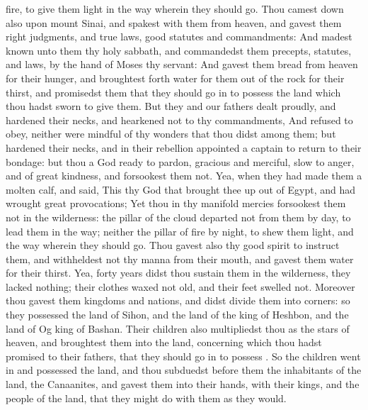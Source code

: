 {fire, to give them
light in the
way wherein they should
go.
Thou camest
down also upon
mount
Sinai, and
spakest with them from
heaven, and
gavest them
right
judgments, and
true
laws,
good
statutes and
commandments:
And madest
known unto them thy
holy
sabbath, and
commandedst them
precepts,
statutes, and
laws, by the
hand of
Moses thy
servant:
And
gavest them
bread from
heaven for their
hunger, and broughtest
forth
water for them out of the
rock for their
thirst, and
promisedst them that they should go
in to
possess the
land which thou hadst
sworn to
give them.
But they and our
fathers dealt
proudly, and
hardened their
necks, and
hearkened not to thy
commandments,
And
refused to
obey, neither were
mindful of thy
wonders that thou
didst among them; but
hardened their
necks, and in their
rebellion
appointed a
captain to
return to their
bondage: but thou
{} a
God ready to
pardon,
gracious and
merciful,
slow to
anger, and of
great
kindness, and
forsookest them not.
Yea, when they had
made them a
molten
calf, and
said, This
{} thy
God that brought thee
up out of
Egypt, and had
wrought
great
provocations;
Yet thou in thy
manifold
mercies
forsookest them not in the
wilderness: the
pillar of the
cloud
departed not from them by
day, to
lead them in the
way; neither the
pillar of
fire by
night, to shew them
light, and the
way wherein they should
go.
Thou
gavest also thy
good
spirit to
instruct them, and
withheldest not thy
manna from their
mouth, and
gavest them
water for their
thirst.
Yea,
forty
years didst thou
sustain them in the
wilderness,
{} they
lacked nothing; their
clothes waxed not
old, and their
feet
swelled not.
Moreover thou
gavest them
kingdoms and
nations, and didst
divide them into
corners: so they
possessed the
land of
Sihon, and the
land of the
king of
Heshbon, and the
land of
Og
king of
Bashan.
Their
children also
multipliedst thou as the
stars of
heaven, and
broughtest them into the
land, concerning which thou hadst
promised to their
fathers, that they should go
in to
possess
{}.
So the
children went
in and
possessed the
land, and thou
subduedst
before them the
inhabitants of the
land, the
Canaanites, and
gavest them into their
hands, with their
kings, and the
people of the
land, that they might
do with them as they
would.
}
